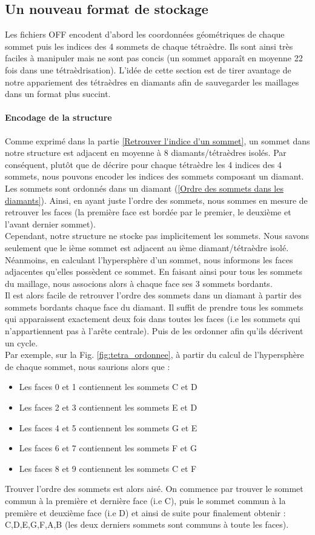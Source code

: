 \subsection{Un nouveau format de stockage}
\noindent
Les fichiers OFF encodent d'abord les coordonnées géométriques de chaque sommet puis les indices des 4 sommets de chaque tétraèdre. Ils sont ainsi très faciles à manipuler mais ne sont pas concis (un sommet apparaît en moyenne 22 fois dans une tétraèdrisation). L'idée de cette section est de tirer avantage de notre appariement des tétraèdres en diamants afin de sauvegarder les maillages dans un format plus succint.
\paragraph{Encodage de la structure}
Comme exprimé dans la partie \ref{Retrouver l'indice d'un sommet}, un sommet dans notre structure est adjacent en moyenne à 8 diamants/tétraèdres isolés. Par conséquent, plutôt que de décrire pour chaque tétraèdre les 4 indices des 4 sommets, nous pouvons encoder les indices des sommets composant un diamant. Les sommets sont ordonnés dans un diamant (\ref{Ordre des sommets dans les diamants}). Ainsi, en ayant juste l'ordre des sommets, nous sommes en mesure de retrouver les faces (la première face est bordée par le premier, le deuxième et l'avant dernier sommet).\\
Cependant, notre structure ne stocke pas implicitement les sommets. Nous savons seulement que le ième sommet est adjacent au ième diamant/tétraèdre isolé. Néanmoins, en calculant l'hypersphère d'un sommet, nous informons les faces adjacentes qu'elles possèdent ce sommet. En faisant ainsi pour tous les sommets du maillage, nous associons alors à chaque face ses 3 sommets bordants.\\
Il est alors facile de retrouver l'ordre des sommets dans un diamant à partir des sommets bordants chaque face du diamant. Il suffit de prendre tous les sommets qui apparaissent exactement deux fois dans toutes les faces (i.e les sommets qui n'appartiennent pas à l'arête centrale). Puis de les ordonner afin qu'ils décrivent un cycle.\\
Par exemple, sur la Fig. \ref{fig:tetra_ordonnee}, à partir du calcul de l'hypersphère de chaque sommet, nous saurions alors que :
\begin{itemize}
\item Les faces 0 et 1 contiennent les sommets C et D
\item Les faces 2 et 3 contiennent les sommets E et D
\item Les faces 4 et 5 contiennent les sommets G et E
\item Les faces 6 et 7 contiennent les sommets F et G
\item Les faces 8 et 9 contiennent les sommets C et F\\
\end{itemize}
Trouver l'ordre des sommets est alors aisé. On commence par trouver le sommet commun à la première et dernière face (i.e C), puis le sommet commun à la première et deuxième face (i.e D) et ainsi de suite pour finalement obtenir : C,D,E,G,F,A,B (les deux derniers sommets sont communs à toute les faces).

